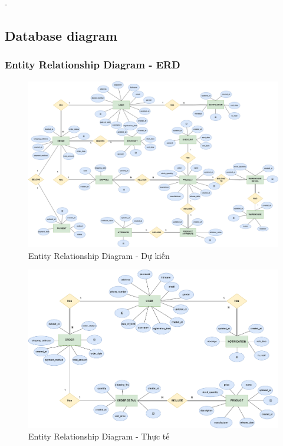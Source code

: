 \begin {list} {-}{}
\subsection{Database diagram}
\subsubsection {Entity Relationship Diagram - ERD}
\begin{figure}[H]
    \centering
    \includegraphics[scale=0.2]{images/hieu/chap-3/database-diagram-dukien.png}
    \caption{Entity Relationship Diagram - Dự kiến}
\end{figure}
\begin{figure}[H]
    \centering
    \includegraphics[scale=0.3]{images/hieu/chap-3/full-database-diagram.png}
    \caption{Entity Relationship Diagram - Thực tế}
\end{figure}

\end{list}
